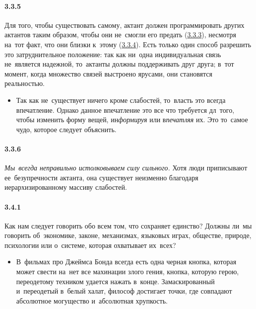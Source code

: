 \paragraph{3.3.5}\hypertarget{par:3.3.5}{} Для того, чтобы существовать самому, актант должен программировать других актантов таким образом, чтобы они не~смогли его предать (\hyperlink{par:3.3.3}{3.3.3}), несмотря на~тот факт, что они близки к~этому (\hyperlink{par:3.3.4}{3.3.4}). Есть только один способ разрешить это затруднительное положение: так как ни~одна индивидуальная связь не~является надежной, то~актанты должны поддерживать друг друга; в~тот момент, когда множество связей выстроено ярусами, они становятся реальностью.
	\begin{itemize}
	\item 
	Так как не~существует ничего кроме слабостей, то~власть это всегда впечатление. Однако данное впечатление это все что требуется дл~того, чтобы изменить форму вещей, ин{\itshape{формируя}} или в{\itshape{печатляя}} их. Это то~самое чудо, которое следует объяснить.
	\end{itemize}

\paragraph{3.3.6}\hypertarget{par:3.3.6}{} {\itshape Мы~всегда неправильно истолковываем силу сильного.} Хотя люди приписывают ее~безупречности актанта, она существует неизменно благодаря иерархизированному массиву слабостей.


\paragraph{3.4.1}\hypertarget{par:3.4.1}{} Как нам следует говорить обо всем том, что сохраняет единство? Должны ли~мы говорить об~экономике, законе, механизмах, языковых играх, обществе, природе, психологии или о~системе, которая охватывает их~всех?
	\begin{itemize}
	\item 
 В~фильмах про Джеймса Бонда всегда есть одна черная кнопка, которая может свести на~нет все махинации злого гения, кнопка, которую герою, переодетому техником удается нажать в~конце. Замаскированный и~переодетый в~белый халат, философ достигает точки, где совпадают абсолютное могущество и~абсолютная хрупкость.
	\end{itemize}

